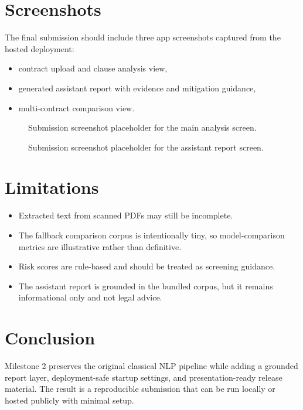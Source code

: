 \documentclass[11pt]{article}
\begin{document}
\section{Screenshots}
The final submission should include three app screenshots captured from the hosted deployment:
\begin{itemize}
    \item contract upload and clause analysis view,
    \item generated assistant report with evidence and mitigation guidance,
    \item multi-contract comparison view.
\end{itemize}

\begin{figure}[H]
\centering
{}
\caption{Submission screenshot placeholder for the main analysis screen.}
\label{fig:screenshot-main}
\end{figure}

\begin{figure}[H]
\centering
{}
\caption{Submission screenshot placeholder for the assistant report screen.}
\label{fig:screenshot-report}
\end{figure}

\section{Limitations}
\begin{itemize}
    \item Extracted text from scanned PDFs may still be incomplete.
    \item The fallback comparison corpus is intentionally tiny, so model-comparison metrics are illustrative rather than definitive.
    \item Risk scores are rule-based and should be treated as screening guidance.
    \item The assistant report is grounded in the bundled corpus, but it remains informational only and not legal advice.
\end{itemize}

\section{Conclusion}
Milestone 2 preserves the original classical NLP pipeline while adding a grounded report layer, deployment-safe startup settings, and presentation-ready release material. The result is a reproducible submission that can be run locally or hosted publicly with minimal setup.



\end{document}
